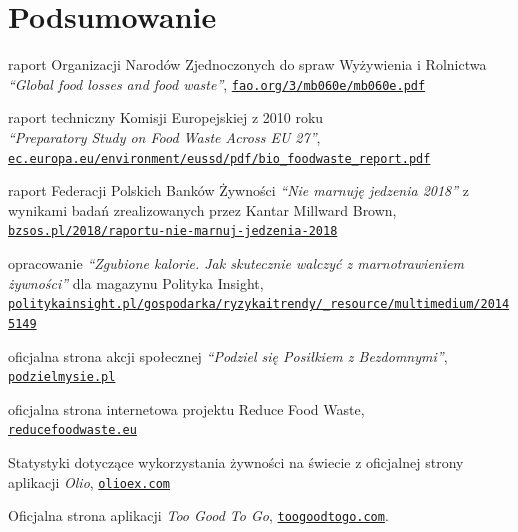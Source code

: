 \documentclass[licencjacka]{pracamgr}
\begin{document}
\chapter{Podsumowanie}\label{r:pods}
\begin{thebibliography}{99}

 raport Organizacji Narodów Zjednoczonych do spraw Wyżywienia i Rolnictwa\\\textit{``Global food losses and food waste''}, \href{http://www.fao.org/3/mb060e/mb060e.pdf}{\texttt{fao.org/3/mb060e/mb060e.pdf}}

 raport techniczny Komisji Europejskiej z 2010 roku\\\textit{``Preparatory Study on Food Waste Across EU 27''},\\\href{http://ec.europa.eu/environment/eussd/pdf/bio\_foodwaste\_report.pdf}{\texttt{ec.europa.eu/environment/eussd/pdf/bio\_foodwaste\_report.pdf}}

raport Federacji Polskich Banków Żywności \textit{``Nie marnuję jedzenia 2018''} z wynikami badań zrealizowanych przez Kantar Millward Brown,\\\href{http://bzsos.pl/2018/raportu-nie-marnuj-jedzenia-2018}{\texttt{bzsos.pl/2018/raportu-nie-marnuj-jedzenia-2018}}

opracowanie \textit{``Zgubione kalorie. Jak skutecznie walczyć z marnotrawieniem żywności''} dla magazynu Polityka Insight,\\\href{http://politykainsight.pl/gospodarka/ryzykaitrendy/\_resource/multimedium/20145149}{\texttt{politykainsight.pl/gospodarka/ryzykaitrendy/\_resource/multimedium/20145149}}

 oficjalna strona akcji społecznej \textit{``Podziel się Posiłkiem z Bezdomnymi''}, \href{http://www.podzielmysie.pl}{\texttt{podzielmysie.pl}}

 oficjalna strona internetowa projektu Reduce Food Waste,\\
    \href{http://www.reducefoodwaste.eu}{\texttt{reducefoodwaste.eu}}

 Statystyki dotyczące wykorzystania żywności na świecie z oficjalnej strony aplikacji  \textit{Olio}, \href{https://olioex.com}{\texttt{olioex.com}}

 Oficjalna strona aplikacji \textit{Too Good To Go}, \href{https://toogoodtogo.com}{\texttt{toogoodtogo.com}}.


\end{thebibliography}
\end{document}
